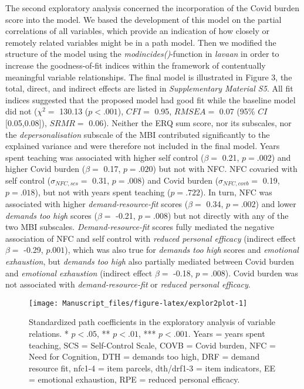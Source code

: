 \documentclass[
  english,
  man,floatsintext]{apa6}
\begin{document}
The second exploratory analysis concerned the incorporation of the Covid burden score into the model.
We based the development of this model on the partial correlations of all variables, which provide an indication of how closely or remotely related variables might be in a path model.
Then we modified the structure of the model using the \emph{modincides()}-function in \emph{lavaan} in order to increase the goodness-of-fit indices within the framework of contentually meaningful variable relationships.
The final model is illustrated in Figure 3, the total, direct, and indirect effects are listed in \emph{Supplementary Material S5}.
All fit indices suggested that the proposed model had good fit while the baseline model did not (\(\chi^2=\) 130.13 (\(p < .001\)), \(CFI=\) 0.95, \(RMSEA=\) 0.07 (95\% \(CI\) {[}0.05,0.08{]}), \(SRMR=\) 0.06).
Neither the ERQ sum score, nor its subscales, nor the \emph{depersonalisation} subscale of the MBI contributed significantly to the explained variance and were therefore not included in the final model.
Years spent teaching was associated with higher self control (\(\beta=\) 0.21, \(p=.002\)) and higher Covid burden (\(\beta=\) 0.17, \(p=.020\)) but not with NFC.
NFC covaried with self control (\(\sigma_{NFC,scs}=\) 0.31, \(p=.008\)) and Covid burden (\(\sigma_{NFC,covb}=\) 0.19, \(p=.018\)), but not with years spent teaching (\(p=.722\)).
In turn, NFC was associated with higher \emph{demand-resource-fit} scores (\(\beta=\) 0.34, \(p=.002\)) and lower \emph{demands too high} scores (\(\beta=\) -0.21, \(p=.008\)) but not directly with any of the two MBI subscales.
\emph{Demand-resource-fit} scores fully mediated the negative association of NFC and self control with \emph{reduced personal efficacy} (indirect effect \(\beta=\) -0.29, \(p.001\)), which was also true for \emph{demands too high} scores and \emph{emotional exhaustion}, but \emph{demands too high} also partially mediated between Covid burden and \emph{emotional exhaustion} (indirect effect \(\beta=\) -0.18, \(p=.008\)).
Covid burden was not associated with \emph{demand-resource-fit} or \emph{reduced personal efficacy}.

\begin{figure}[H]
\texttt{[image: Manuscript\_files/figure-latex/explor2plot-1]} \caption{Standardized path coefficients in the exploratory analysis of variable relations. * $p<.05$, ** $p<.01$, *** $p<.001$. Years = years spent teaching, SCS = Self-Control Scale, COVB = Covid burden, NFC = Need for Cognition, DTH = demands too high, DRF = demand resource fit, nfc1-4 = item parcels, dth/drf1-3 = item indicators, EE = emotional exhaustion, RPE = reduced personal efficacy.}\label{fig:explor2plot}
\end{figure}
\end{document}
